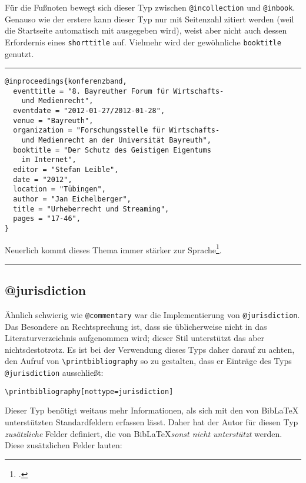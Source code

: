 \documentclass[11pt,a4paper,DIV=calc,draft]{scrartcl}
\newcommand\software[1]{\textsf{#1}}
\newcommand\Biblatex{\software{Bib\LaTeX{}}\xspace}
\newenvironment{rubexample}{\par\vspace{\baselineskip}\hrule\par\begin{refsection}}{\end{refsection}\par\hrule\par\vspace{\baselineskip}}
\begin{document}
Für die Fußnoten bewegt sich dieser Typ zwischen \verb+@incollection+
und \verb+@inbook+. Genauso wie der erstere kann dieser Typ nur mit
Seitenzahl zitiert werden (weil die Startseite automatisch mit
ausgegeben wird), weist aber nicht auch dessen Erfordernis eines
\verb+shorttitle+ auf. Vielmehr wird der gewöhnliche \verb+booktitle+
genutzt.

\begin{rubexample}
\begin{verbatim}
@inproceedings{konferenzband,
  eventtitle = "8. Bayreuther Forum für Wirtschafts-
    und Medienrecht",
  eventdate = "2012-01-27/2012-01-28",
  venue = "Bayreuth",
  organization = "Forschungsstelle für Wirtschafts-
    und Medienrecht an der Universität Bayreuth",
  booktitle = "Der Schutz des Geistigen Eigentums
    im Internet",
  editor = "Stefan Leible",
  date = "2012",
  location = "Tübingen",
  author = "Jan Eichelberger",
  title = "Urheberrecht und Streaming",
  pages = "17-46",
}
\end{verbatim}

Neuerlich kommt dieses Thema immer stärker zur
Sprache\footcite[25]{konferenzband}.

\printbibliography
\end{rubexample}

\subsection{@jurisdiction}

Ähnlich schwierig wie \verb+@commentary+ war die Implementierung von
\verb+@jurisdiction+. Das Besondere an Rechtsprechung ist, dass sie
üblicherweise nicht in das Literaturverzeichnis aufgenommen wird;
dieser Stil unterstützt das aber nichtsdestotrotz. Es ist bei der
Verwendung dieses Typs daher darauf zu achten, den Aufruf von
\verb+\printbibliography+ so zu gestalten, dass er Einträge des Typs
\verb+@jurisdiction+ ausschließt:

\begin{verbatim}
\printbibliography[nottype=jurisdiction]
\end{verbatim}

Dieser Typ benötigt weitaus mehr Informationen, als sich mit den von
\Biblatex unterstützten Standardfeldern erfassen lässt. Daher hat der
Autor für diesen Typ \emph{zusätzliche} Felder definiert, die von
\Biblatex \emph{sonst nicht unterstützt} werden. Diese zusätzlichen
Felder lauten:
\end{document}

